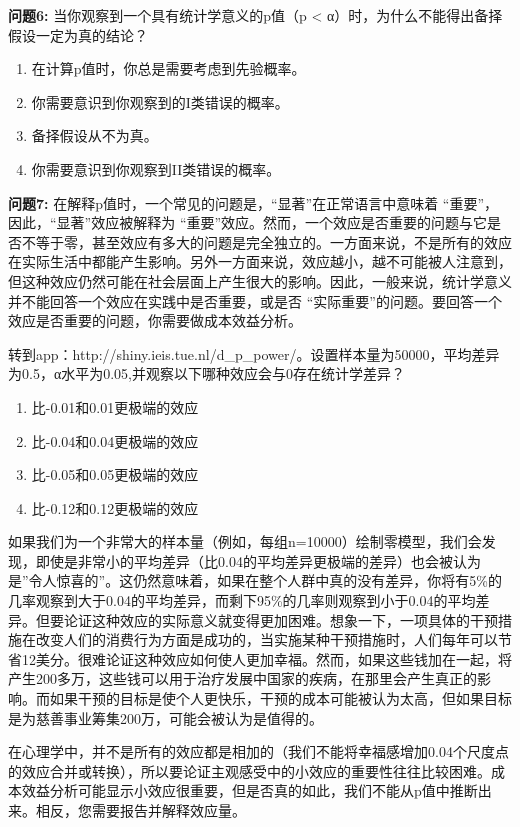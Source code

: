 \documentclass[
  letterpaper,
  DIV=11,
  numbers=noendperiod]{scrreprt}
\providecommand{\tightlist}{%
  \setlength{\itemsep}{0pt}\setlength{\parskip}{0pt}}\usepackage{longtable,booktabs,array}
\begin{document}
\textbf{问题6:} 当你观察到一个具有统计学意义的p值（p \textless{}
α）时，为什么不能得出备择假设一定为真的结论？

\begin{enumerate}
\def\labelenumi{\Alph{enumi})}
\tightlist
\item
  在计算p值时，你总是需要考虑到先验概率。
\item
  你需要意识到你观察到的I类错误的概率。
\item
  备择假设从不为真。
\item
  你需要意识到你观察到II类错误的概率。
\end{enumerate}

\textbf{问题7:}
在解释p值时，一个常见的问题是，``显著''在正常语言中意味着
``重要''，因此，``显著''效应被解释为
``重要''效应。然而，一个效应是否重要的问题与它是否不等于零，甚至效应有多大的问题是完全独立的。一方面来说，不是所有的效应在实际生活中都能产生影响。另外一方面来说，效应越小，越不可能被人注意到，但这种效应仍然可能在社会层面上产生很大的影响。因此，一般来说，统计学意义并不能回答一个效应在实践中是否重要，或是否
``实际重要''的问题。要回答一个效应是否重要的问题，你需要做成本效益分析。

转到app：http://shiny.ieis.tue.nl/d\_p\_power/。设置样本量为50000，平均差异为0.5，α水平为0.05,并观察以下哪种效应会与0存在统计学差异？

\begin{enumerate}
\def\labelenumi{\Alph{enumi})}
\tightlist
\item
  比-0.01和0.01更极端的效应
\item
  比-0.04和0.04更极端的效应
\item
  比-0.05和0.05更极端的效应
\item
  比-0.12和0.12更极端的效应
\end{enumerate}

如果我们为一个非常大的样本量（例如，每组n=10000）绘制零模型，我们会发现，即使是非常小的平均差异（比0.04的平均差异更极端的差异）也会被认为是''令人惊喜的''。这仍然意味着，如果在整个人群中真的没有差异，你将有5\%的几率观察到大于0.04的平均差异，而剩下95\%的几率则观察到小于0.04的平均差异。但要论证这种效应的实际意义就变得更加困难。想象一下，一项具体的干预措施在改变人们的消费行为方面是成功的，当实施某种干预措施时，人们每年可以节省12美分。很难论证这种效应如何使人更加幸福。然而，如果这些钱加在一起，将产生200多万，这些钱可以用于治疗发展中国家的疾病，在那里会产生真正的影响。而如果干预的目标是使个人更快乐，干预的成本可能被认为太高，但如果目标是为慈善事业筹集200万，可能会被认为是值得的。

在心理学中，并不是所有的效应都是相加的（我们不能将幸福感增加0.04个尺度点的效应合并或转换），所以要论证主观感受中的小效应的重要性往往比较困难。成本效益分析可能显示小效应很重要，但是否真的如此，我们不能从p值中推断出来。相反，您需要报告并解释效应量。
\end{document}
